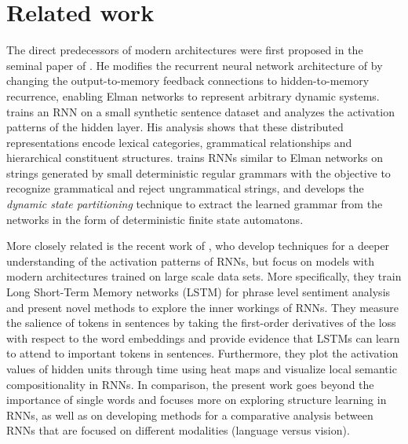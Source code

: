 \section{Related work}
\label{sec:related}

The direct predecessors of modern architectures were first proposed in the 
seminal paper of . He modifies the recurrent 
neural network architecture of  by changing the output-to-memory 
feedback connections to hidden-to-memory recurrence, enabling Elman networks to 
represent arbitrary dynamic systems.  trains an RNN on a small synthetic
sentence  dataset and analyzes the activation patterns of the hidden
layer. His analysis shows that these distributed representations  
encode lexical categories, grammatical relationships and hierarchical constituent 
structures.  trains RNNs similar to Elman
networks on strings generated by small 
deterministic regular grammars with the objective to recognize grammatical and reject ungrammatical 
strings, and develops the \emph{dynamic state partitioning} technique to extract the learned 
grammar from the networks in the form of deterministic finite state
automatons.

More closely related is the recent work of , who develop techniques 
for a deeper understanding of the activation patterns of RNNs, but focus on models with 
modern architectures trained on large scale data sets. More specifically, they train Long 
Short-Term Memory networks (LSTM) \cite{hochreiter1997long} 
for phrase level sentiment analysis 
and present novel methods 
to explore the inner workings of RNNs. They measure the salience of tokens
in sentences by taking the first-order derivatives of the loss with respect to the
word embeddings and provide evidence 
that LSTMs can learn to attend to important tokens in sentences. Furthermore,
they plot the activation values of hidden units through time using heat maps 
and visualize local semantic compositionality in RNNs. 
In comparison, the present work goes beyond the importance of single words and focuses more on exploring structure 
learning in RNNs, as well as on developing methods for a comparative analysis between RNNs that are focused on different modalities (language versus vision).

